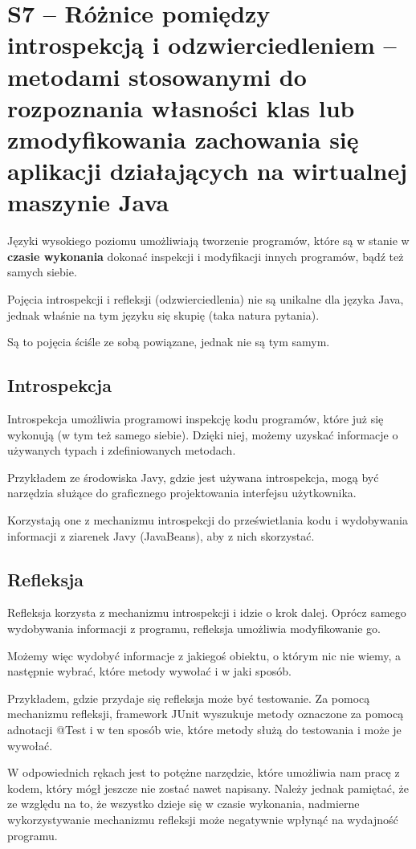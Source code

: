 \section{S7 -- Różnice pomiędzy introspekcją i odzwierciedleniem – metodami stosowanymi do rozpoznania własności klas lub zmodyfikowania zachowania się aplikacji działających na wirtualnej maszynie Java}

Języki wysokiego poziomu umożliwiają tworzenie programów, które są w stanie w \textbf{czasie wykonania} dokonać inspekcji i modyfikacji innych programów, bądź też samych siebie.

Pojęcia introspekcji i refleksji (odzwierciedlenia) nie są unikalne dla języka Java, jednak właśnie na tym języku się skupię (taka natura pytania).

Są to pojęcia ściśle ze sobą powiązane, jednak nie są tym samym.

\subsection{Introspekcja}

Introspekcja umożliwia programowi inspekcję kodu programów, które już się wykonują (w tym też samego siebie).
Dzięki niej, możemy uzyskać informacje o używanych typach i zdefiniowanych metodach.

Przykładem ze środowiska Javy, gdzie jest używana introspekcja, mogą być narzędzia służące do graficznego projektowania interfejsu użytkownika.

Korzystają one z mechanizmu introspekcji do prześwietlania kodu i wydobywania informacji z ziarenek Javy (JavaBeans), aby z nich skorzystać.

\subsection{Refleksja}

Refleksja korzysta z mechanizmu introspekcji i idzie o krok dalej.
Oprócz samego wydobywania informacji z programu, refleksja umożliwia modyfikowanie go.

Możemy więc wydobyć informacje z jakiegoś obiektu, o którym nic nie wiemy, a następnie wybrać, które metody wywołać i w jaki sposób.

Przykładem, gdzie przydaje się refleksja może być testowanie.
Za pomocą mechanizmu refleksji, framework JUnit wyszukuje metody oznaczone za pomocą adnotacji @Test i w ten sposób wie, które metody służą do testowania i może je wywołać.

W odpowiednich rękach jest to potężne narzędzie, które umożliwia nam pracę z kodem, który mógł jeszcze nie zostać nawet napisany.
Należy jednak pamiętać, że ze względu na to, że wszystko dzieje się w czasie wykonania, nadmierne wykorzystywanie mechanizmu refleksji może negatywnie wpłynąć na wydajność programu.
